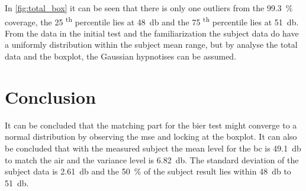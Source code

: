 In \autoref{fig:total_box} it can be seen that there is only one outliers from the \SI{99.3}{\percent} coverage, the 25 \textsuperscript{th} percentile lies at \SI{48}{\decibel} and the 75 \textsuperscript{th} percentile lies at \SI{51}{\decibel}. From the data in the initial test and the familiarization the subject data do have a uniformly distribution within the subject mean range, but by analyse the total data and the boxplot, the Gaussian hypnotises can be assumed.


\section{Conclusion}
It can be concluded that the matching part for the \gls{bier} test might converge to a normal distribution by observing the \gls{mse} and locking at the boxplot. It can also be concluded that with the measured subject the mean level for the \gls{bc} is \SI{49.1}{\decibel} to match the air and the variance level is \SI{6.82}{\decibel}. The standard deviation of the subject data is \SI{2.61}{\decibel} and the \SI{50}{\percent} of the subject result lies within \SI{48}{\decibel} to \SI{51}{\decibel}.





